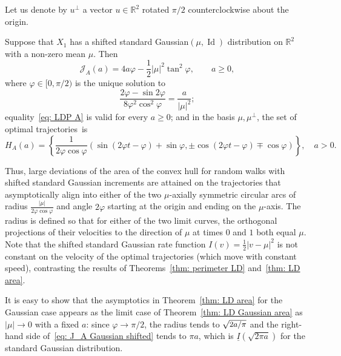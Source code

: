 \documentclass[AHL,Unicode,published]{cedram}
\DeclareMathOperator{\id}{Id}
\newcommand{\ubar}[1]{\underline{#1}}
\newcommand{\Rbb}{\mathbb{R}}
\newcommand{\Jcl}{\mathcal{J}}
\begin{document}
Let us denote by $u^\bot$ a vector $u \in \Rbb^2$ rotated $\pi/2$ counterclockwise about the origin.

\begin{theo}\label{thm: LD Gaussian area}
Suppose that $X_1$ has a shifted standard Gaussian$(\mu, \id)$ distribution on $\Rbb^2$ with a non-zero mean $\mu$. Then
\begin{equation}\label{eq: J_A Gaussian shifted}
\Jcl_A(a)=4 a \varphi - \frac12 |\mu|^2 \tan^2 \varphi, \qquad a \ge 0,
\end{equation}
where $\varphi \in [0, \pi/2)$ is the unique solution to
\[
\frac{2\varphi - \sin 2 \varphi}{8 \varphi^2 \cos^2 \varphi} = \frac{a}{|\mu|^2};
\]
equality~\eqref{eq: LDP A} is valid for every $a \ge 0$; and in the basis $\mu, \mu^\bot$, the set of optimal trajectories~is
\begin{equation}\label{eq: A shape shifted}
H_A(a)= \left\{ \frac{1}{2 \varphi \cos \varphi} \left(\sin(2 \varphi t - \varphi) + \sin \varphi, \pm \cos(2 \varphi t - \varphi) \mp \cos \varphi \right) \right\}, \quad a>0.
\end{equation}
\end{theo}

Thus, large deviations of the area of the convex hull for random walks with shifted standard Gaussian increments are attained on the trajectories that asymptotically align into either of the two $\mu$-axially symmetric circular arcs of radius $\frac{|\mu|}{2 \varphi \cos \varphi}$ and angle $2 \varphi$ starting at the origin and ending on the $\mu$-axis. The radius is defined so that for either of the two limit curves, the orthogonal projections of their velocities to the direction of $\mu$ at times $0$ and $1$ both equal $\mu$. Note that the shifted standard Gaussian rate function $I(v)=\frac12 |v-\mu|^2$ is not constant on the velocity of the optimal trajectories (which move with constant speed), contrasting the results of Theorems~\ref{thm: perimeter LD} and~\ref{thm: LD area}.


It is easy to show that the asymptotics in Theorem~\ref{thm: LD area} for the Gaussian case appears as the limit case of Theorem~\ref{thm: LD Gaussian area} as $|\mu| \to 0$ with a fixed $a$: since $\varphi \to \pi/2$, the radius tends to $\sqrt{\text{\small{$2a/\pi$}}}$ and the right-hand side of~\eqref{eq: J_A Gaussian shifted} tends to $\pi a$, which is $\ubar I (\sqrt{2 \pi a })$ for the standard Gaussian distribution.
\end{document}
